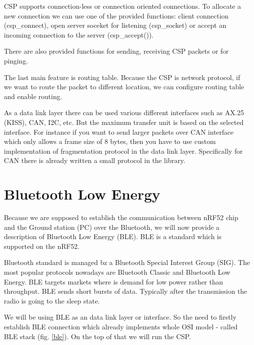 \documentclass[conference]{IEEEtran}
\begin{document}
CSP supports connection-less or connection oriented connections. To allocate a new connection we can use one of the provided functions: client connection (csp\_connect), open server soceket for listening (csp\_socket) or accept an incoming connection to the server (csp\_accept()).

There are also provided functions for sending, receiving CSP packets or for pinging.

The last main feature is routing table. Because the CSP is network protocol, if we want to route the packet to different location, we can configure routing table and enable routing.

As a data link layer there can be used various different interfaces such as AX.25 (KISS), CAN, I2C, etc. But the maximum transfer unit is based on the selected interface. For instance if you want to send larger packets over CAN interface which only allows a frame size of 8 bytes, then you have to use custom implementation of fragmentation protocol in the data link layer. Specifically for CAN there is already written a small protocol in the library.

\section{Bluetooth Low Energy}
Because we are supposed to establish the communication between nRF52 chip and the Ground station (PC) over the Bluetooth, we will now provide a description of Bluetooth Low Energy (BLE). BLE is a standard which is supported on the nRF52.

Bluetooth standard is managed bz a Bluetooth Special Interest Group (SIG). The most popular protocols nowadays are Bluetooth Classic and Bluetooth Low Energy. BLE targets markets where is demand for low power rather than throughput. BLE sends short bursts of data. Typically after the transmission the radio is going to the sleep state.\cite{NovelBits}

We will be using BLE as an data link layer or interface. So the need to firstly establish BLE connection which already implements whole OSI model - called BLE stack (fig. \ref{ble}). On the top of that we will run the CSP.
\end{document}
